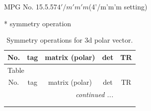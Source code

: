 \documentclass[fleqn,8pt]{jsarticle}
\begin{document}
\setcounter{MaxMatrixCols}{32}

\renewcommand{\tablename}{Table~}
\renewcommand{\figurename}{Figure~}
\begin{center}
\LARGE
MPG No. 15.5.57\quad$4'/m'm'm$\quad(4'/m'm'm setting)
\end{center}
* symmetry operation
\renewcommand{\arraystretch}{1.3}
\begin{longtable}{ccccc}
\caption{Symmetry operations for 3d polar vector.}
 \\
 \hline \hline
No. & tag & matrix (polar) & det & TR \\ \hline \endfirsthead

\multicolumn{4}{l}{\tablename\ \thetable{}} \\
 \hline \hline
No. & tag & matrix (polar) & det & TR \\ \hline \endhead

 \hline \hline
\multicolumn{4}{r}{\footnotesize\it continued ...} \\ \endfoot

 \hline \hline
\multicolumn{4}{r}{} \\ \endlastfoot


\end{longtable}
\end{document}

